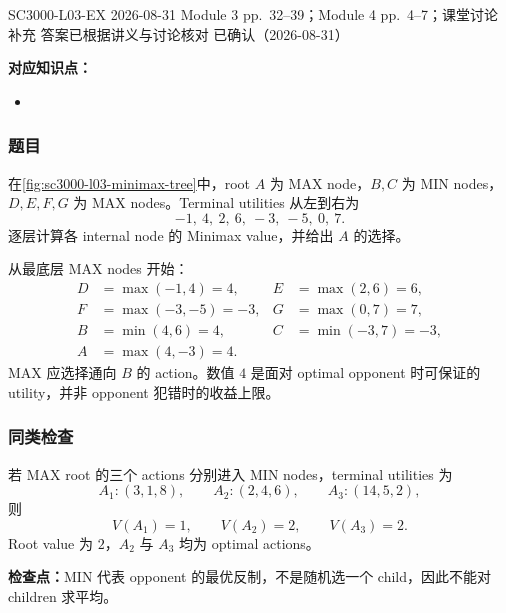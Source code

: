 
\clearpage
{}

\examplemeta
  {SC3000-L03-EX}
  {2026-08-31}
  {Module 3 pp.~32--39；Module 4 pp.~4--7；课堂讨论补充}
  {答案已根据讲义与讨论核对}
  {已确认（2026-08-31）}


\textbf{对应知识点：}
\begin{itemize}
  \item {}
\end{itemize}

\subsubsection*{题目}

在\cref{fig:sc3000-l03-minimax-tree}中，root $A$ 为 MAX node，$B,C$ 为 MIN nodes，$D,E,F,G$ 为 MAX nodes。Terminal utilities 从左到右为
\[
  -1,\ 4,\ 2,\ 6,\ -3,\ -5,\ 0,\ 7.
\]
逐层计算各 internal node 的 Minimax value，并给出 $A$ 的选择。

\begin{checkedsolution}
从最底层 MAX nodes 开始：
\[
  \begin{aligned}
    D&=\max(-1,4)=4, & E&=\max(2,6)=6,\\
    F&=\max(-3,-5)=-3, & G&=\max(0,7)=7,\\
    B&=\min(4,6)=4, & C&=\min(-3,7)=-3,\\
    A&=\max(4,-3)=4.&&
  \end{aligned}
\]
MAX 应选择通向 $B$ 的 action。数值 $4$ 是面对 optimal opponent 时可保证的 utility，并非 opponent 犯错时的收益上限。
\end{checkedsolution}

\subsubsection*{同类检查}

若 MAX root 的三个 actions 分别进入 MIN nodes，terminal utilities 为
\[
  A_1:(3,1,8),\qquad A_2:(2,4,6),\qquad A_3:(14,5,2),
\]
则
\[
  V(A_1)=1,\qquad V(A_2)=2,\qquad V(A_3)=2.
\]
Root value 为 $2$，$A_2$ 与 $A_3$ 均为 optimal actions。

\textbf{检查点：}MIN 代表 opponent 的最优反制，不是随机选一个 child，因此不能对 children 求平均。

